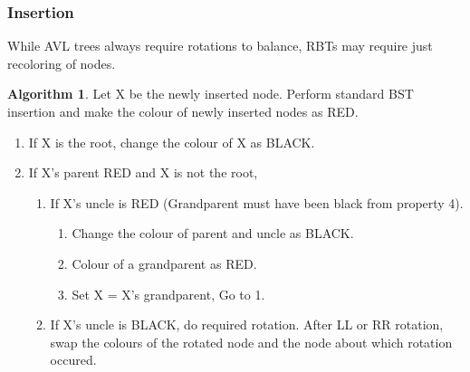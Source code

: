 \documentclass[10pt, a4paper]{extarticle}
\theoremstyle{definition}
\newtheorem{alg}{Algorithm}
\begin{document}
\subsubsection{Insertion}
While AVL trees always require rotations to balance, RBTs may require just recoloring of nodes.
\begin{alg}
	Let X be the newly inserted node.
	Perform standard BST insertion and make the colour of newly inserted nodes as RED.
	\begin{enumerate}
		\item If X is the root, change the colour of X as BLACK.
		\item If X’s parent RED and X is not the root,
		      \begin{enumerate}
			      \item If X’s uncle is RED (Grandparent must have been black from property 4).
			            \begin{enumerate}
				            \item Change the colour of parent and uncle as BLACK.
				            \item Colour of a grandparent as RED.
				            \item Set X = X’s grandparent, Go to 1.
			            \end{enumerate}
			      \item If X’s uncle is BLACK, do required rotation. After LL or RR rotation, swap the colours of the rotated node and the node about which rotation occured.
		      \end{enumerate}
	\end{enumerate}
\end{alg}
\end{document}
